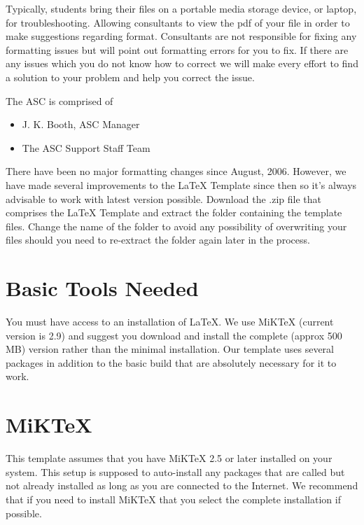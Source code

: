 Typically, students bring their files on a portable media storage device, or laptop, for troubleshooting. Allowing consultants to view the pdf of your file in order to make suggestions regarding format. Consultants are not responsible for fixing any formatting issues but will point out formatting errors for you to fix. If there are any issues which you do not know how to correct we will make every effort to find a solution to your problem and help you correct the issue. \citet{Antonio02}

The ASC is comprised of
    \begin{itemize}
    \item J. K. Booth, ASC Manager \vspace{-10 pt}
    \item The ASC Support Staff Team
    \end{itemize}
    
There have been no major formatting changes since August, 2006. However, we have made several improvements to the LaTeX Template since then so it's always advisable to work with latest version possible. Download the .zip file that comprises the LaTeX Template and extract the folder containing the template files. Change the name of the folder to avoid any possibility of overwriting your files should you need to re-extract the folder again later in the process. \citep{Bailey}
\section{Basic Tools Needed}
You must have access to an installation of \LaTeX. We use MiKTeX (current version is 2.9) and suggest you download and install the complete (approx 500 MB) version rather than the minimal installation. Our template uses several packages in addition to the basic build that are absolutely necessary for it to work. \citep{ahal:2005,dici:1989b,datt:1995} 
\section{MiKTeX}
This template assumes that you have MiKTeX 2.5 or later installed on your system. This setup is supposed to auto-install any packages that are called but not already installed as long as you are connected to the Internet. We recommend that if you need to install MiKTeX that you select the complete installation if possible.
